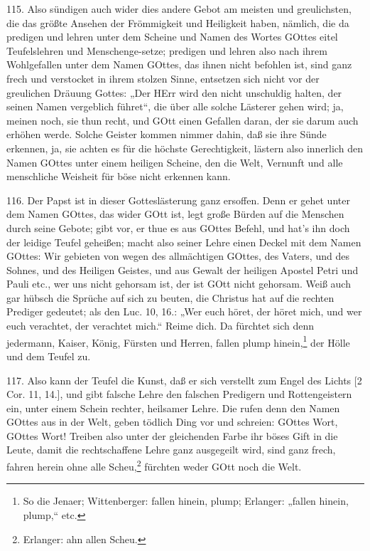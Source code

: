115. Also sündigen auch wider dies andere Gebot am meisten und greulichsten, die das größte Ansehen der Frömmigkeit und Heiligkeit haben, nämlich, die da predigen und lehren unter dem Scheine und Namen des Wortes GOttes eitel Teufelslehren und Menschenge-setze; predigen und lehren also nach ihrem Wohlgefallen unter dem Namen GOttes, das ihnen nicht befohlen ist, sind ganz frech und verstocket in ihrem stolzen Sinne, entsetzen sich nicht vor der greulichen Dräuung Gottes: „Der HErr wird den nicht unschuldig halten, der seinen Namen vergeblich führet“, die über alle solche Lästerer gehen wird; ja, meinen noch, sie thun recht, und GOtt einen Gefallen daran, der sie darum auch erhöhen werde. Solche Geister kommen nimmer dahin, daß sie ihre Sünde erkennen, ja, sie achten es für die höchste Gerechtigkeit, lästern also innerlich den Namen GOttes unter einem heiligen Scheine, den die Welt, Vernunft und alle menschliche Weisheit für böse nicht erkennen kann.

116. Der Papst ist in dieser Gotteslästerung ganz ersoffen. Denn er gehet unter dem Namen GOttes, das wider GOtt ist, legt große Bürden auf die Menschen durch seine Gebote; gibt vor, er thue es aus GOttes Befehl, und hat’s ihn doch der leidige Teufel geheißen; macht also seiner Lehre einen Deckel mit dem Namen GOttes: Wir gebieten von wegen des allmächtigen GOttes, des Vaters, und des Sohnes, und des Heiligen Geistes, und aus Gewalt der heiligen Apostel Petri und Pauli etc., wer uns nicht gehorsam ist, der ist GOtt nicht gehorsam. Weiß auch gar hübsch die Sprüche auf sich zu beuten, die Christus hat auf die rechten Prediger gedeutet; als den Luc. 10, 16.: „Wer euch höret, der höret mich, und wer euch verachtet, der verachtet mich.“ Reime dich. Da fürchtet sich denn jedermann, Kaiser, König, Fürsten und Herren, fallen plump hinein,\footnote{So die Jenaer; Wittenberger: fallen hinein, plump; Erlanger: „fallen hinein, plump,“ etc.} der Hölle und dem Teufel zu.

117. Also kann der Teufel die Kunst, daß er sich verstellt zum Engel des Lichts [2 Cor. 11, 14.], und gibt falsche Lehre den falschen Predigern und Rottengeistern ein, unter einem Schein rechter, heilsamer Lehre. Die rufen denn den Namen GOttes aus in der Welt, geben tödlich Ding vor und schreien: GOttes Wort, GOttes Wort! Treiben also unter der gleichenden Farbe ihr böses Gift in die Leute, damit die rechtschaffene Lehre ganz ausgegeilt wird, sind ganz frech, fahren herein ohne alle Scheu,\footnote{Erlanger: ahn allen Scheu.} fürchten weder GOtt noch die Welt.

